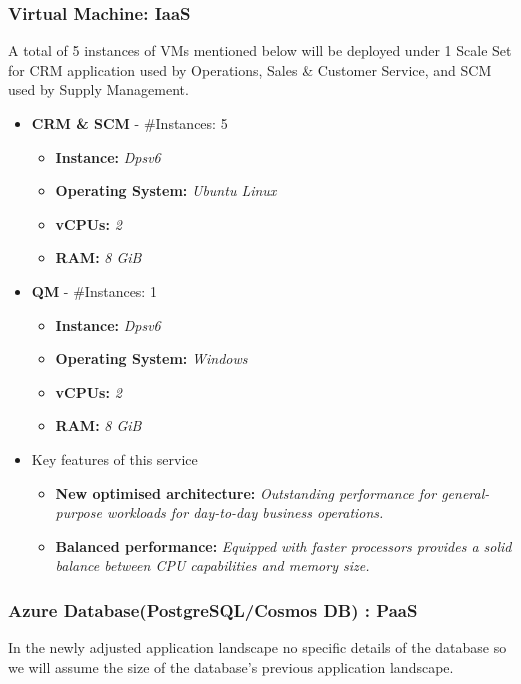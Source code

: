 \documentclass{llncs}
\begin{document}
\subsubsection{Virtual Machine: IaaS} \leavevmode\newline
A total of 5 instances of VMs mentioned below will be deployed under 1 Scale Set for CRM application used by Operations, Sales \& Customer Service, and SCM used by Supply Management.
\begin{itemize}
    \item \textbf{CRM \& SCM} - \#Instances: 5
          \begin{itemize}
              \item \textbf{Instance:} \textit{Dpsv6}
              \item  \textbf{Operating System:} \textit{Ubuntu Linux}
              \item  \textbf{vCPUs:} \textit{2}
              \item  \textbf{RAM:} \textit{8 GiB}
          \end{itemize}
    \item \textbf{QM} - \#Instances: 1
          \begin{itemize}
              \item \textbf{Instance:} \textit{Dpsv6}
              \item  \textbf{Operating System:} \textit{Windows}
              \item  \textbf{vCPUs:} \textit{2}
              \item  \textbf{RAM:} \textit{8 GiB}
          \end{itemize}
    \item Key features of this service
          \begin{itemize}
              \item  \textbf{New optimised architecture:} \textit{Outstanding performance for general-purpose workloads for day-to-day business operations.}
              \item  \textbf{Balanced performance:} \textit{Equipped with faster processors provides a solid balance between CPU capabilities and memory size.}
          \end{itemize}
\end{itemize}

\subsubsection{Azure Database(PostgreSQL/Cosmos DB) : PaaS} \leavevmode\newline
In the newly adjusted application landscape no specific details of the database so we will assume the size of the database's previous application landscape.
\end{document}
